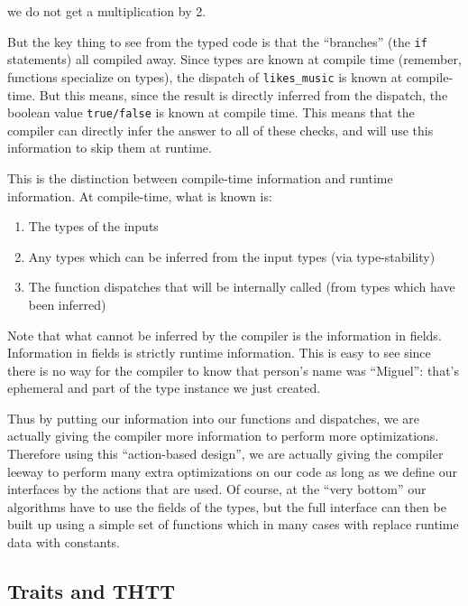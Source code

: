 \documentclass[11pt]{article}
\begin{document}
we do not get a multiplication by 2.

    But the key thing to see from the typed code is that the ``branches''
(the \texttt{if} statements) all compiled away. Since types are known at
compile time (remember, functions specialize on types), the dispatch of
\texttt{likes\_music} is known at compile-time. But this means, since
the result is directly inferred from the dispatch, the boolean value
\texttt{true/false} is known at compile time. This means that the
compiler can directly infer the answer to all of these checks, and will
use this information to skip them at runtime.

This is the distinction between compile-time information and runtime
information. At compile-time, what is known is:

\begin{enumerate}
\def\labelenumi{\arabic{enumi})}
\item
  The types of the inputs
\item
  Any types which can be inferred from the input types (via
  type-stability)
\item
  The function dispatches that will be internally called (from types
  which have been inferred)
\end{enumerate}

Note that what cannot be inferred by the compiler is the information in
fields. Information in fields is strictly runtime information. This is
easy to see since there is no way for the compiler to know that person's
name was ``Miguel'': that's ephemeral and part of the type instance we
just created.

Thus by putting our information into our functions and dispatches, we
are actually giving the compiler more information to perform more
optimizations. Therefore using this ``action-based design'', we are
actually giving the compiler leeway to perform many extra optimizations
on our code as long as we define our interfaces by the actions that are
used. Of course, at the ``very bottom'' our algorithms have to use the
fields of the types, but the full interface can then be built up using a
simple set of functions which in many cases with replace runtime data
with constants.

    \hypertarget{traits-and-thtt}{%
\subsection{Traits and THTT}\label{traits-and-thtt}}
\end{document}
